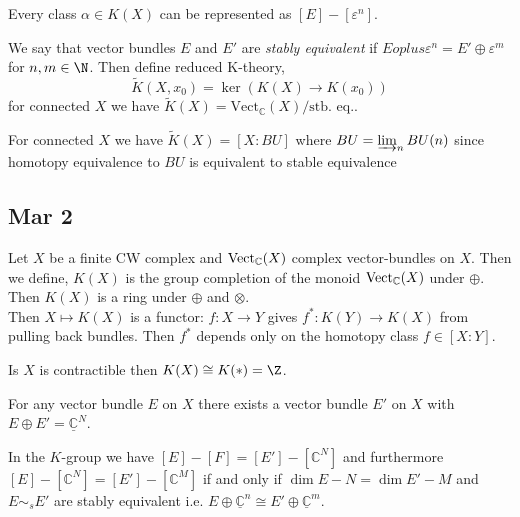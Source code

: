 \documentclass[12pt]{extarticle}
\begin{document}
\begin{prop}
Every class $\alpha \in K(X)$ can be represented as $[E] - [\varepsilon^n]$. 
\end{prop}

\begin{prop}

\end{prop}

\newcommand{\C}{\mathbb{C}}

\begin{defn}
We say that vector bundles $E$ and $E'$ are \textit{stably equivalent} if $E oplus \varepsilon^n = E' \oplus \varepsilon^{m}$ for $n,m \in \N$. Then define reduced K-theory,
\[ \tilde{K}(X, x_0) = \ker{(K(X) \to K(x_0))} \]
for connected $X$ we have $\tilde{K}(X) = \mathrm{Vect}_{\C}(X) / \text{stb. eq.}$. 
\end{defn}

\begin{prop}
For connected $X$ we have $\tilde{K}(X) = [X : BU]$ where $BU = \varinjlim_{n} BU(n)$ since homotopy equivalence to $BU$ is equivalent to stable equivalence 
\end{prop}

\subsection{Mar 2}

Let $X$ be a finite CW complex and $\Vect_\C(X)$ complex vector-bundles on $X$. Then we define,  $K(X)$ is the group completion of the monoid $\Vect_{\C}(X)$ under $\oplus$. Then $K(X)$ is a ring under $\oplus$ and $\otimes$.
\bigskip\\
Then $X \mapsto K(X)$ is a functor: $f : X \to Y$ gives $f^* : K(Y) \to K(X)$ from pulling back bundles. Then $f^*$ depends only on the homotopy class $f \in [X : Y]$.
\bigskip\\
\begin{rmk}
Is $X$ is contractible then $K(X) \cong K(*) = \Z$.
\end{rmk}

\begin{prop}
For any vector bundle $E$ on $X$ there exists a vector bundle $E'$ on $X$ with $E \oplus E' = \underline{\C}^{N}$. 
\end{prop}

\begin{cor}
In the $K$-group we have $[E] - [F] = [E'] - [\C^N]$ and furthermore $[E] - [\C^N] = [E'] - [\C^M]$ if and only if $\dim{E} - N = \dim{E'} - M$ and $E \sim_s E'$ are stably equivalent i.e. $E \oplus \underline{\C}^n \cong E' \oplus \underline{\C}^m$.  
\end{cor}
\end{document}
